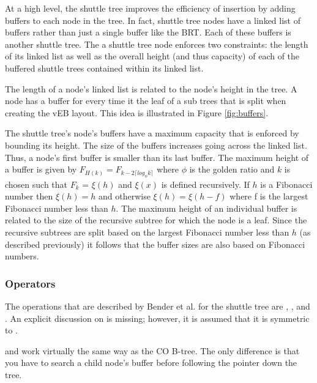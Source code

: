 \documentclass{style}
\begin{document}
At a high level, the shuttle tree improves the efficiency of insertion by
adding buffers to each node in the tree. In fact, shuttle tree nodes have a
linked list of buffers rather than just a single buffer like the BRT. Each of
these buffers is another shuttle tree. The a shuttle tree node enforces two
constraints: the length of its linked list as well as the overall height (and
thus capacity) of each of the buffered shuttle trees contained within its
linked list.

The length of a node's linked list is related to the node's height in the
tree. A node has a buffer for every time it the leaf of a sub trees that is
split when creating the vEB layout. This idea is illustrated in Figure
\ref{fig:buffers}.

The shuttle tree's node's buffers have a maximum capacity that is enforced by
bounding its height. The size of the buffers increases going across the linked
list. Thus, a node's first buffer is smaller than its last buffer. The maximum
height of a buffer is given by $F_{H(k)} = F_{k-2 \lceil log_{\phi} k \rceil}
$ where $\phi$ is the golden ratio and $k$ is chosen such that $F_k$ =
$\xi(h)$ and $\xi(x)$ is defined recursively. If $h$ is a Fibonacci number
then $\xi(h) = h$ and otherwise $\xi(h) = \xi(h-f)$ where f is the largest
Fibonacci number less than $h$. The maximum height of an individual buffer is
related to the size of the recursive subtree for which the node is a leaf.
Since the recursive subtrees are split based on the largest Fibonacci number
less than $h$ (as described previously) it follows that the buffer sizes are
also based on Fibonacci numbers.

\subsubsection{Operators}

The operations that are described by Bender et al. for the shuttle tree are
\Search{}, \Insert{}, and \Scan{}. An explicit discussion on \Delete{} is
missing; however, it is assumed that it is symmetric to \Insert{}.

\Search{} and \Scan{} work virtually the same way as the CO B-tree. The only
difference is that you have to search a child node's buffer before following
the pointer down the tree.
\end{document}
